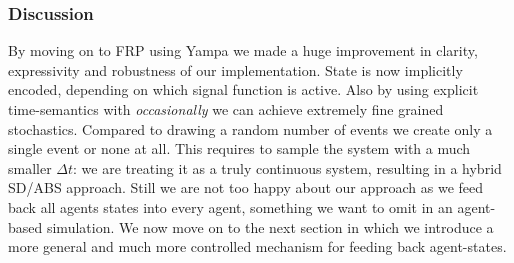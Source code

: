 \subsubsection{Discussion}
By moving on to FRP using Yampa we made a huge improvement in clarity, expressivity and robustness of our implementation. State is now implicitly encoded, depending on which signal function is active. Also by using explicit time-semantics with \textit{occasionally} we can achieve extremely fine grained stochastics. Compared to drawing a random number of events we create only a single event or none at all. This requires to sample the system with a much smaller $\Delta t$: we are treating it as a truly continuous system, resulting in a hybrid SD/ABS approach.
Still we are not too happy about our approach as we feed back all agents states into every agent, something we want to omit in an agent-based simulation. We now move on to the next section in which we introduce a more general and much more controlled mechanism for feeding back agent-states. 